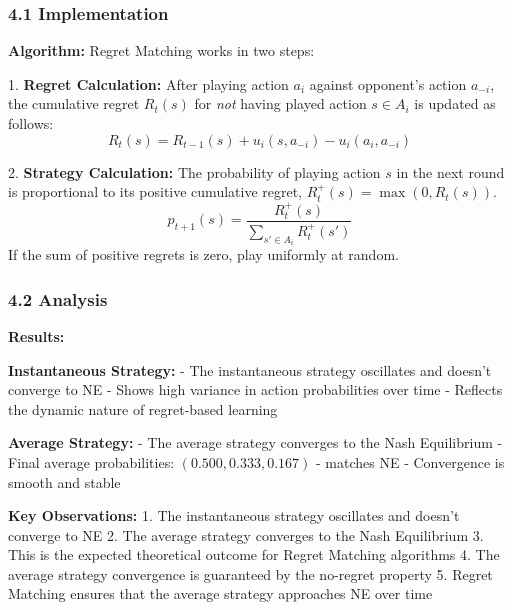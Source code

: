 \documentclass[12pt]{article}
\begin{document}
{{{{\subsubsection{4.1 Implementation}

\textbf{Algorithm:} Regret Matching works in two steps:

1. \textbf{Regret Calculation:} After playing action $a_i$ against opponent's action $a_{-i}$, the cumulative regret $R_t(s)$ for \textit{not} having played action $s \in A_i$ is updated as follows:
    $$R_t(s) = R_{t-1}(s) + u_i(s, a_{-i}) - u_i(a_i, a_{-i})$$

2. \textbf{Strategy Calculation:} The probability of playing action $s$ in the next round is proportional to its positive cumulative regret, $R_t^+(s) = \max(0, R_t(s))$.
    $$p_{t+1}(s) = \frac{R_t^+(s)}{\sum_{s' \in A_i} R_t^+(s')}$$
    If the sum of positive regrets is zero, play uniformly at random.

\subsubsection{4.2 Analysis}

\textbf{Results:}

\textbf{Instantaneous Strategy:}
- The instantaneous strategy oscillates and doesn't converge to NE
- Shows high variance in action probabilities over time
- Reflects the dynamic nature of regret-based learning

\textbf{Average Strategy:}
- The average strategy converges to the Nash Equilibrium
- Final average probabilities: $(0.500, 0.333, 0.167)$ - matches NE
- Convergence is smooth and stable

\textbf{Key Observations:}
1. The instantaneous strategy oscillates and doesn't converge to NE
2. The average strategy converges to the Nash Equilibrium
3. This is the expected theoretical outcome for Regret Matching algorithms
4. The average strategy convergence is guaranteed by the no-regret property
5. Regret Matching ensures that the average strategy approaches NE over time


\newpage

{}}}}}
\end{document}
